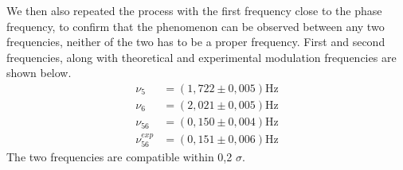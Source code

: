 \documentclass{article}
\begin{document}
We then also repeated the process with the first frequency close to the phase frequency, to confirm that the phenomenon can be observed between any two frequencies, neither of the two has to be a proper frequency. First and second frequencies, along with theoretical and experimental modulation frequencies are shown below.
\begin{align}
    \nu_{5} &= (1,722 \pm 0,005) \text{Hz} \\
    \nu_{6} &= (2,021 \pm 0,005) \text{Hz} \\
    \nu_{56} &= (0,150 \pm 0,004) \text{Hz} \\
    \nu_{56}^{exp} &= (0,151 \pm 0,006) \text{Hz} 
\end{align}
The two frequencies are compatible within 0,2 $\sigma$.
\end{document}
